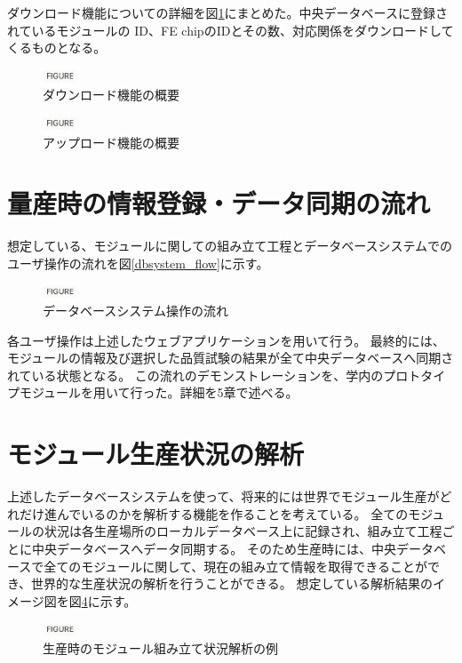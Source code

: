 ダウンロード機能についての詳細を図\ref{pd_download_info}にまとめた。中央データベースに登録されているモジュールの ID、FE chipのIDとその数、対応関係をダウンロードしてくるものとなる。
\begin{figure}[bpt]\centering
\includegraphics[width=1cm]{figure}
\caption[ダウンロード機能の概要]{ダウンロード機能の概要}
\label{pd_download_info}
\end{figure}

\begin{figure}[bpt]\centering
\includegraphics[width=1cm]{figure}
\caption[アップロード機能の概要]{アップロード機能の概要}
\label{pd_upload_info}
\end{figure}

\newpage
\section{量産時の情報登録・データ同期の流れ}
想定している、モジュールに関しての組み立て工程とデータベースシステムでのユーザ操作の流れを図\ref{dbsystem_flow}に示す。

\begin{figure}[bpt]\centering
\includegraphics[width=1cm]{figure}
\caption[データベースシステム操作の流れ]{データベースシステム操作の流れ}
\label{webapp_sign_off}
\end{figure}

各ユーザ操作は上述したウェブアプリケーションを用いて行う。
最終的には、モジュールの情報及び選択した品質試験の結果が全て中央データベースへ同期されている状態となる。
この流れのデモンストレーションを、学内のプロトタイプモジュールを用いて行った。詳細を5章で述べる。

\section{モジュール生産状況の解析}
上述したデータベースシステムを使って、将来的には世界でモジュール生産がどれだけ進んでいるのかを解析する機能を作ることを考えている。
全てのモジュールの状況は各生産場所のローカルデータベース上に記録され、組み立て工程ごとに中央データベースへデータ同期する。
そのため生産時には、中央データベースで全てのモジュールに関して、現在の組み立て情報を取得できることができ、世界的な生産状況の解析を行うことができる。
想定している解析結果のイメージ図を図\ref{production_analysis}に示す。

\begin{figure}[bpt]\centering
\includegraphics[width=1cm]{figure}
\caption[生産時のモジュール組み立て状況解析の例]{生産時のモジュール組み立て状況解析の例}
\label{production_analysis}
\end{figure}


